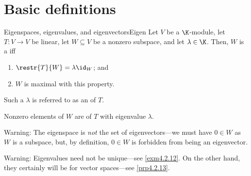 \section{Basic definitions}

\begin{dfn}{Eigenspaces, eigenvalues, and eigenvectors}{Eigen}
	Let $V$ be a $\K$-module, let $T\colon V\rightarrow V$ be linear, let $W\subseteq V$ be a nonzero subspace, and let $\lambda \in \K$.  Then, $W$ is a  iff
	\begin{enumerate}
		\item \label{Eigen(i)}$\restr{T}{W}=\lambda \id _W$; and
		\item \label{Eigen(ii)}$W$ is maximal with this property.
	\end{enumerate}
	\begin{rmk}
		Such a $\lambda$ is referred to as an  of $T$.
	\end{rmk}
	\begin{rmk}
		Nonzero elements of $W$ are  of $T$ with eigenvalue $\lambda$.
	\end{rmk}
	\begin{rmk}
		Warning:  The eigenspace is \emph{not} the set of eigenvectors---we must have $0\in W$ as $W$ is a subspace, but, by definition, $0\in W$ is forbidden from being an eigenvector.
	\end{rmk}
	\begin{rmk}
		Warning:  Eigenvalues need not be unique---see \cref{exm4.2.12}.  On the other hand, they certainly will be for vector spaces---see \cref{prp4.2.13}.
		

\end{rmk}
\end{dfn}
